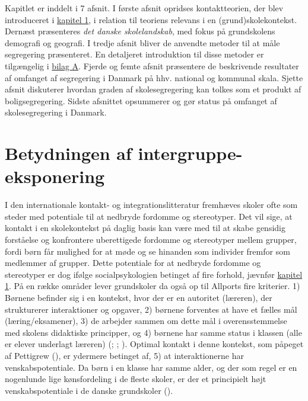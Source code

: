 \documentclass[
]{book}
\begin{document}
Kapitlet er inddelt i 7 afsnit. I første afsnit opridses kontaktteorien, der blev introduceret i \hyperref[kap1]{kapitel 1}, i relation til teoriens relevans i en (grund)skolekontekst. Dernæst præsenteres \emph{det danske skolelandskab}, med fokus på grundskolens demografi og geografi. I tredje afsnit bliver de anvendte metoder til at måle segregering præsenteret. En detaljeret introduktion til disse metoder er tilgængelig i \hyperref[bilag1]{bilag A}. Fjerde og femte afsnit præsentere de beskrivende resultater af omfanget af segregering i Danmark på hhv. national og kommunal skala. Sjette afsnit diskuterer hvordan graden af skolesegregering kan tolkes som et produkt af boligsegregering. Sidste afsnittet opsummerer og gør status på omfanget af skolesegregering i Danmark.

\section{Betydningen af intergruppe-eksponering}\label{betydningen-af-intergruppe-eksponering}

I den internationale kontakt- og integrationslitteratur fremhæves skoler ofte som steder med potentiale til at nedbryde fordomme og stereotyper. Det vil sige, at kontakt i en skolekontekst på daglig basis kan være med til at skabe gensidig forståelse og konfrontere uberettigede fordomme og stereotyper mellem grupper, fordi børn får mulighed for at møde og se hinanden som individer fremfor som medlemmer af grupper. Dette potentiale for at nedbryde fordomme og stereotyper er dog ifølge socialpsykologien betinget af fire forhold, jævnfør \hyperref[kap1]{kapitel 1}. På en række områder lever grundskoler da også op til Allports fire kriterier. 1) Børnene befinder sig i en kontekst, hvor der er en autoritet (læreren), der strukturerer interaktioner og opgaver, 2) børnene forventes at have et fælles mål (læring/eksamener), 3) de arbejder sammen om dette mål i overensstemmelse med skolens didaktiske principper, og 4) børnene har samme status i klassen (alle er elever underlagt læreren) (; ; ). Optimal kontakt i denne kontekst, som påpeget af Pettigrew (), er ydermere betinget af, 5) at interaktionerne har venskabspotentiale. Da børn i en klasse har samme alder, og der som regel er en nogenlunde lige kønsfordeling i de fleste skoler, er der et principielt højt venskabspotentiale i de danske grundskoler ().
\end{document}
